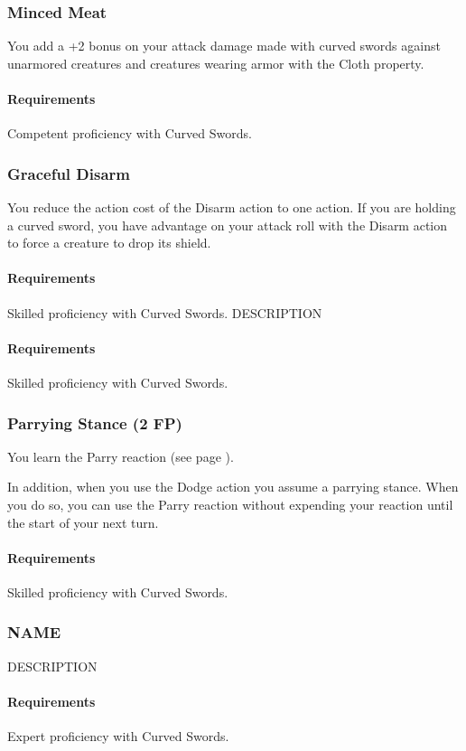 \subsubsection{Minced Meat} \label{feat::mincedmeat}
    You add a +2 bonus on your attack damage made with curved swords against unarmored creatures and creatures wearing armor with the Cloth property.
    \paragraph{Requirements} Competent proficiency with Curved Swords.
\subsubsection{Graceful Disarm} \label{feat::gracefuldisarm}
    You reduce the action cost of the Disarm action to one action.
    If you are holding a curved sword, you have advantage on your attack roll with the Disarm action to force a creature to drop its shield.
    \paragraph{Requirements} Skilled proficiency with Curved Swords.
    DESCRIPTION
    \paragraph{Requirements} Skilled proficiency with Curved Swords.
\subsubsection{Parrying Stance (2 FP)} \label{feat::parryingstance}
    You learn the Parry reaction (see page \pageref{act::parry}).

    In addition, when you use the Dodge action you assume a parrying stance.
    When you do so, you can use the Parry reaction without expending your reaction until the start of your next turn.
    \paragraph{Requirements} Skilled proficiency with Curved Swords.
\subsubsection{NAME} \label{feat::name}
    DESCRIPTION
    \paragraph{Requirements} Expert proficiency with Curved Swords.
